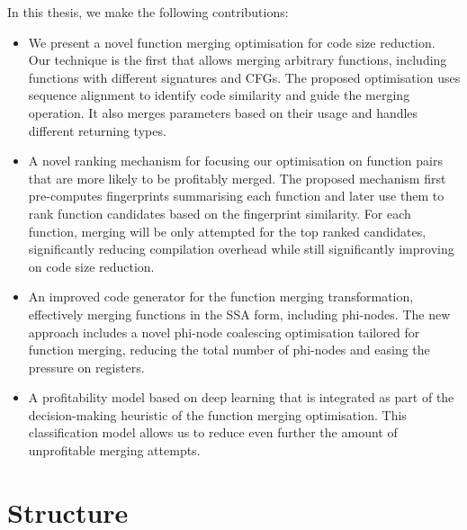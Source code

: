 In this thesis, we make the following contributions:
\begin{itemize}
  \item 
  We present a novel function merging optimisation for code size reduction.
  Our technique is the first that allows merging arbitrary functions, including functions with different signatures and CFGs.
  The proposed optimisation uses sequence alignment to identify code similarity and guide the merging operation.
  It also merges parameters based on their usage and handles different returning types.

  \item
  A novel ranking mechanism for focusing our optimisation on function pairs that are more likely to be profitably merged.
  The proposed mechanism first pre-computes fingerprints summarising each function and later use them to rank function candidates based on the fingerprint similarity.
  For each function, merging will be only attempted for the top ranked candidates, significantly reducing compilation overhead while still significantly improving on code size reduction.


  \item
  An improved code generator for the function merging transformation, effectively merging functions in the SSA form, including phi-nodes.
  The new approach includes a novel phi-node coalescing optimisation tailored for function merging, reducing the total number of phi-nodes and easing the pressure on registers.

  \item
  A profitability model based on deep learning that is integrated as part of the decision-making heuristic of the function merging optimisation.
  This classification model allows us to reduce even further the amount of unprofitable merging attempts.   

\end{itemize}


\section{Structure}

